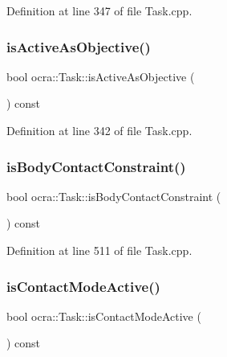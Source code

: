 Definition at line 347 of file Task.\+cpp.

\hypertarget{classocra_1_1Task_aa0753ae62d1996fc802320456dbfc1fb}{}\label{classocra_1_1Task_aa0753ae62d1996fc802320456dbfc1fb} 
\subsubsection{\texorpdfstring{is\+Active\+As\+Objective()}{isActiveAsObjective()}}
{\footnotesize\ttfamily bool ocra\+::\+Task\+::is\+Active\+As\+Objective (\begin{DoxyParamCaption}{ }\end{DoxyParamCaption}) const}



Definition at line 342 of file Task.\+cpp.

\hypertarget{classocra_1_1Task_addb2196431d746d26c208a91d4f0d003}{}\label{classocra_1_1Task_addb2196431d746d26c208a91d4f0d003} 
\subsubsection{\texorpdfstring{is\+Body\+Contact\+Constraint()}{isBodyContactConstraint()}}
{\footnotesize\ttfamily bool ocra\+::\+Task\+::is\+Body\+Contact\+Constraint (\begin{DoxyParamCaption}{ }\end{DoxyParamCaption}) const}



Definition at line 511 of file Task.\+cpp.

\hypertarget{classocra_1_1Task_ac642e15ebcd4ad00b58b27fe180d49eb}{}\label{classocra_1_1Task_ac642e15ebcd4ad00b58b27fe180d49eb} 
\subsubsection{\texorpdfstring{is\+Contact\+Mode\+Active()}{isContactModeActive()}}
{\footnotesize\ttfamily bool ocra\+::\+Task\+::is\+Contact\+Mode\+Active (\begin{DoxyParamCaption}{ }\end{DoxyParamCaption}) const}



